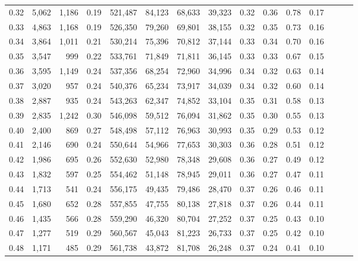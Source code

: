 \begin{tabular}{rrrrrrrrrrrrrrr}
0.32 &   5,062 &  1,186 &  0.19 &  521,487 &   84,123 &   68,633 &   39,323 &  0.32 &  0.36 &  0.78 &      0.17 \\
0.33 &   4,863 &  1,168 &  0.19 &  526,350 &   79,260 &   69,801 &   38,155 &  0.32 &  0.35 &  0.73 &      0.16 \\
0.34 &   3,864 &  1,011 &  0.21 &  530,214 &   75,396 &   70,812 &   37,144 &  0.33 &  0.34 &  0.70 &      0.16 \\
0.35 &   3,547 &    999 &  0.22 &  533,761 &   71,849 &   71,811 &   36,145 &  0.33 &  0.33 &  0.67 &      0.15 \\
0.36 &   3,595 &  1,149 &  0.24 &  537,356 &   68,254 &   72,960 &   34,996 &  0.34 &  0.32 &  0.63 &      0.14 \\
0.37 &   3,020 &    957 &  0.24 &  540,376 &   65,234 &   73,917 &   34,039 &  0.34 &  0.32 &  0.60 &      0.14 \\
0.38 &   2,887 &    935 &  0.24 &  543,263 &   62,347 &   74,852 &   33,104 &  0.35 &  0.31 &  0.58 &      0.13 \\
0.39 &   2,835 &  1,242 &  0.30 &  546,098 &   59,512 &   76,094 &   31,862 &  0.35 &  0.30 &  0.55 &      0.13 \\
0.40 &   2,400 &    869 &  0.27 &  548,498 &   57,112 &   76,963 &   30,993 &  0.35 &  0.29 &  0.53 &      0.12 \\
0.41 &   2,146 &    690 &  0.24 &  550,644 &   54,966 &   77,653 &   30,303 &  0.36 &  0.28 &  0.51 &      0.12 \\
0.42 &   1,986 &    695 &  0.26 &  552,630 &   52,980 &   78,348 &   29,608 &  0.36 &  0.27 &  0.49 &      0.12 \\
0.43 &   1,832 &    597 &  0.25 &  554,462 &   51,148 &   78,945 &   29,011 &  0.36 &  0.27 &  0.47 &      0.11 \\
0.44 &   1,713 &    541 &  0.24 &  556,175 &   49,435 &   79,486 &   28,470 &  0.37 &  0.26 &  0.46 &      0.11 \\
0.45 &   1,680 &    652 &  0.28 &  557,855 &   47,755 &   80,138 &   27,818 &  0.37 &  0.26 &  0.44 &      0.11 \\
0.46 &   1,435 &    566 &  0.28 &  559,290 &   46,320 &   80,704 &   27,252 &  0.37 &  0.25 &  0.43 &      0.10 \\
0.47 &   1,277 &    519 &  0.29 &  560,567 &   45,043 &   81,223 &   26,733 &  0.37 &  0.25 &  0.42 &      0.10 \\
0.48 &   1,171 &    485 &  0.29 &  561,738 &   43,872 &   81,708 &   26,248 &  0.37 &  0.24 &  0.41 &      0.10 \\

\end{tabular}
